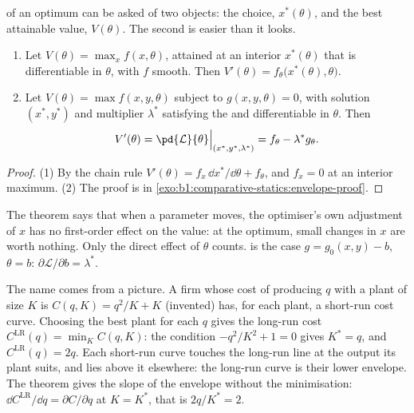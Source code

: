  of an optimum can be asked of two objects: the choice,
$x^*(\theta)$, and the best attainable value, $V(\theta)$. The second is
easier than it looks.

\begin{theorem}\label{thm:b1:comparative-statics:envelope}
\begin{enumerate}
  \item Let $V(\theta) = \max_x f(x, \theta)$, attained at an interior
    $x^*(\theta)$ that is differentiable in $\theta$, with $f$ smooth. Then
    $V'(\theta) = f_\theta\bigl(x^*(\theta), \theta\bigr)$.
  \item Let $V(\theta) = \max f(x, y, \theta)$ subject to
    $g(x, y, \theta) = 0$, with solution $(x^*, y^*)$ and multiplier
    $\lambda^*$ satisfying the  and differentiable in
    $\theta$. Then
    \[
    V'(\theta) = \pd{\mathcal L}{\theta}\Big|_{(x^*, y^*, \lambda^*)}
    = f_\theta - \lambda^* g_\theta .
    \]
\end{enumerate}
\end{theorem}

\begin{proof}
(1) By the chain rule $V'(\theta) = f_x \,\dd x^*/\dd\theta + f_\theta$, and
$f_x = 0$ at an interior maximum. (2) The proof is in
\cref{exo:b1:comparative-statics:envelope-proof}.
\end{proof}

The theorem says that when a parameter moves, the optimiser's own
adjustment of $x$ has no first-order effect on the value: at the optimum,
small changes in $x$ are worth nothing. Only the direct effect of $\theta$
counts.  is the case
$g = g_0(x, y) - b$, $\theta = b$: $\partial\mathcal L/\partial b = \lambda^*$.

The name comes from a picture. A firm whose cost of producing $q$ with a
plant of size $K$ is $C(q, K) = q^2/K + K$ (invented) has, for each plant,
a short-run cost curve. Choosing the best plant for each $q$ gives the
long-run cost $C^{\mathrm{LR}}(q) = \min_K C(q, K)$: the condition
$-q^2/K^2 + 1 = 0$ gives $K^* = q$, and $C^{\mathrm{LR}}(q) = 2q$. Each
short-run curve touches the long-run line at the output its plant suits,
and lies above it elsewhere: the long-run curve is their lower envelope.
The theorem gives the slope of the envelope without the minimisation:
$\dd C^{\mathrm{LR}}/\dd q = \partial C/\partial q$ at $K = K^*$, that is
$2q/K^* = 2$.

